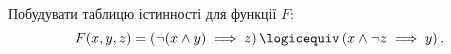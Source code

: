 %
%
^^I^^IПобудувати таблицю істинності для функції $F$:
^^I^^I\[
^^I^^I^^IF(x, y, z) = \left( \neg{(x \land y)} \implies z\right) \logicequiv \left( x \land \neg{z} \implies y \right).
^^I^^I\]
